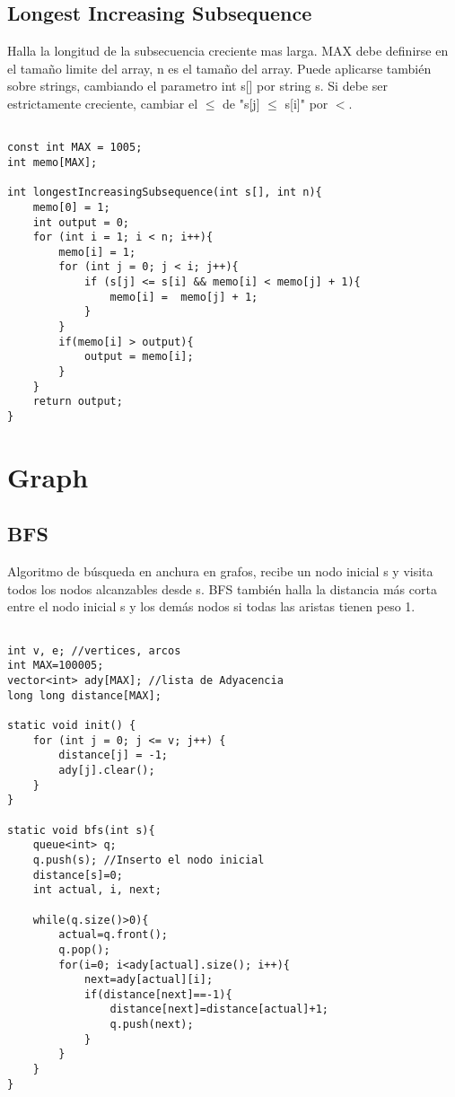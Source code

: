 \documentclass[11pt,letterpaper,twocolumn,twosided]{article}
\begin{document}
\subsection{Longest Increasing Subsequence}
Halla la longitud de la subsecuencia creciente mas larga. MAX debe definirse en el tamaño  limite del array, n es el tamaño del array. Puede aplicarse tambi\'en sobre strings, cambiando el parametro int s[] por string s. Si debe ser estrictamente creciente, cambiar el $\leq $ de "s[j] $\leq $ s[i]" por $<$.

\begin{lstlisting}

const int MAX = 1005;
int memo[MAX];

int longestIncreasingSubsequence(int s[], int n){
	memo[0] = 1;
	int output = 0;
	for (int i = 1; i < n; i++){
		memo[i] = 1;
		for (int j = 0; j < i; j++){
			if (s[j] <= s[i] && memo[i] < memo[j] + 1){
				memo[i] =  memo[j] + 1;
			} 
		}
		if(memo[i] > output){
			output = memo[i];
		}
	}
	return output;
}
\end{lstlisting}

\section{Graph}

\subsection{BFS}
Algoritmo de b\'usqueda en anchura en grafos, recibe un nodo inicial s y visita todos los nodos alcanzables desde s. BFS tambi\'en halla la distancia m\'as corta entre el nodo inicial s y los dem\'as nodos si todas las aristas tienen peso 1.

\begin{lstlisting}

int v, e; //vertices, arcos
int MAX=100005; 
vector<int> ady[MAX]; //lista de Adyacencia
long long distance[MAX];

static void init() {
    for (int j = 0; j <= v; j++) {
        distance[j] = -1;
        ady[j].clear();
    }
}

static void bfs(int s){
    queue<int> q;
    q.push(s); //Inserto el nodo inicial
    distance[s]=0;
    int actual, i, next;
        
    while(q.size()>0){
        actual=q.front();
        q.pop();
        for(i=0; i<ady[actual].size(); i++){
            next=ady[actual][i];
            if(distance[next]==-1){
                distance[next]=distance[actual]+1;
                q.push(next);
            }
        }
    }
}
\end{lstlisting}
\end{document}
